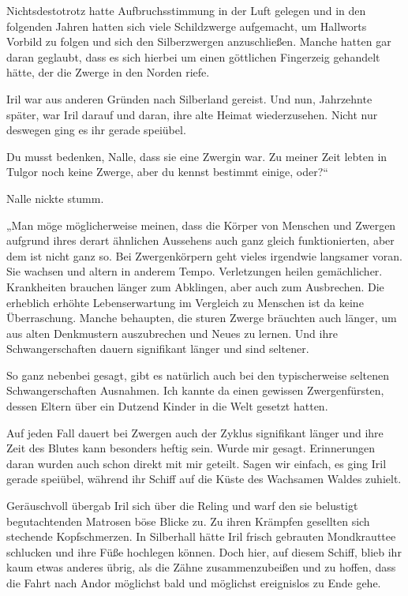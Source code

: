 Nichtsdestotrotz hatte Aufbruchsstimmung in der Luft gelegen und in den folgenden Jahren hatten sich viele Schildzwerge aufgemacht, um Hallworts Vorbild zu folgen und sich den Silberzwergen anzuschließen. Manche hatten gar daran geglaubt, dass es sich hierbei um einen göttlichen Fingerzeig gehandelt hätte, der die Zwerge in den Norden riefe.

Iril war aus anderen Gründen nach Silberland gereist. Und nun, Jahrzehnte später, war Iril darauf und daran, ihre alte Heimat wiederzusehen. Nicht nur deswegen ging es ihr gerade speiübel.

Du musst bedenken, Nalle, dass sie eine Zwergin war. Zu meiner Zeit lebten in Tulgor noch keine Zwerge, aber du kennst bestimmt einige, oder?“

Nalle nickte stumm.

„Man möge möglicherweise meinen, dass die Körper von Menschen und Zwergen aufgrund ihres derart ähnlichen Aussehens auch ganz gleich funktionierten, aber dem ist nicht ganz so. Bei Zwergenkörpern geht vieles irgendwie langsamer voran. Sie wachsen und altern in anderem Tempo. Verletzungen heilen gemächlicher. Krankheiten brauchen länger zum Abklingen, aber auch zum Ausbrechen. Die erheblich erhöhte Lebenserwartung im Vergleich zu Menschen ist da keine Überraschung. Manche behaupten, die sturen Zwerge bräuchten auch länger, um aus alten Denkmustern auszubrechen und Neues zu lernen. Und ihre Schwangerschaften dauern signifikant länger und sind seltener.

So ganz nebenbei gesagt, gibt es natürlich auch bei den typischerweise seltenen Schwangerschaften Ausnahmen. Ich kannte da einen gewissen Zwergenfürsten, dessen Eltern über ein Dutzend Kinder in die Welt gesetzt hatten.

Auf jeden Fall dauert bei Zwergen auch der Zyklus signifikant länger und ihre Zeit des Blutes kann besonders heftig sein. Wurde mir gesagt. Erinnerungen daran wurden auch schon direkt mit mir geteilt. Sagen wir einfach, es ging Iril gerade speiübel, während ihr Schiff auf die Küste des Wachsamen Waldes zuhielt.

Geräuschvoll übergab Iril sich über die Reling und warf den sie belustigt begutachtenden Matrosen böse Blicke zu. Zu ihren Krämpfen gesellten sich stechende Kopfschmerzen. In Silberhall hätte Iril frisch gebrauten Mondkrauttee schlucken und ihre Füße hochlegen können. Doch hier, auf diesem Schiff, blieb ihr kaum etwas anderes übrig, als die Zähne zusammenzubeißen und zu hoffen, dass die Fahrt nach Andor möglichst bald und möglichst ereignislos zu Ende gehe.

